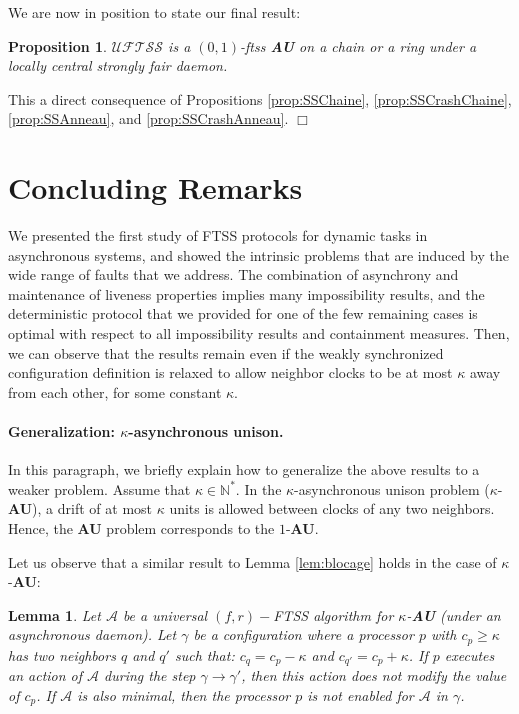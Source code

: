 \documentclass[11pt,english,letterpaper]{article}
\newtheorem{lemma}{Lemma}
\newtheorem{proposition}{Proposition}
\newenvironment{proof}{{\noindent\bf Proof. } }{{\hfill $\Box$}}
\begin{document}
We are now in position to state our final result:

\begin{proposition}\label{prop:ftss}
$\mathcal{UFTSS}$ is a $(0,1)$-ftss \textbf{AU} on a chain or a ring under a locally central strongly fair daemon.
\end{proposition}

\begin{proof}
This a direct consequence of Propositions \ref{prop:SSChaine}, \ref{prop:SSCrashChaine}, \ref{prop:SSAnneau}, and \ref{prop:SSCrashAnneau}.
\end{proof}

\section{Concluding Remarks}\label{sec:conclusion}

We presented the first study of FTSS protocols for dynamic tasks in asynchronous systems, and showed the intrinsic problems that are induced by the wide range of faults that we address. The combination of asynchrony and maintenance of liveness properties implies many impossibility results, and the deterministic protocol that we provided for one of the few remaining cases is optimal with respect to all impossibility results and containment measures. Then, we can observe that the results remain even if the weakly synchronized configuration definition is relaxed to allow neighbor clocks to be at most $\kappa$ away from each other, for some constant $\kappa$.

\paragraph{Generalization: $\kappa$-asynchronous unison.} In this paragraph, we briefly explain how to generalize the above results to a weaker problem. Assume that $\kappa\in\mathbb{N}^*$. In the $\kappa$-asynchronous unison problem ($\kappa$-\textbf{AU}), a drift of at most $\kappa$ units is allowed between clocks of any two neighbors. Hence, the \textbf{AU} problem corresponds to the $1$-\textbf{AU}.

Let us observe that a similar result to Lemma \ref{lem:blocage} holds in the case of $\kappa$-\textbf{AU}:

\begin{lemma}
Let $\mathcal{A}$ be a universal $(f,r)-$FTSS algorithm for $\kappa$-\textbf{AU} (under an asynchronous daemon). Let $\gamma$ be a configuration where a processor $p$ with $c_{p}\geq \kappa$ has two neighbors $q$ and $q'$ such that: $c_{q}=c_{p}-\kappa$ and $c_{q'}=c_{p}+\kappa$.
	If $p$ executes an action of $\mathcal{A}$ during the step $\gamma\longrightarrow\gamma'$, then this action does not modify the value of $c_{p}$.
  If $\mathcal{A}$ is also minimal, then the processor $p$ is not enabled for $\mathcal{A}$ in $\gamma$.
\end{lemma}
\end{document}
